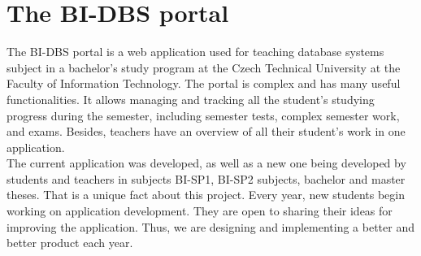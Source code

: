 \section{The BI-DBS portal}
The BI-DBS portal is a web application used for teaching database systems subject in a bachelor's study program at the Czech Technical University at the Faculty of Information Technology. The portal is complex and has many useful functionalities. It allows managing and tracking all the student's studying progress during the semester, including semester tests, complex semester work, and exams. Besides, teachers have an overview of all their student's work in one application.\\
The current application was developed, as well as a new one being developed by students and teachers in subjects BI-SP1, BI-SP2 subjects, bachelor and master theses. That is a unique fact about this project. Every year, new students begin working on application development. They are open to sharing their ideas for improving the application. Thus, we are designing and implementing a better and better product each year.


